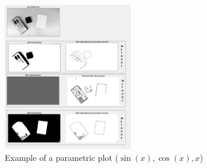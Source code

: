 \documentclass{article}
\begin{document}
\begin{figure}[h]
\caption{Example of a parametric plot ($\sin (x), \cos(x), x$)}
\centering
\includegraphics[width=0.5\textwidth]{comparison_methods}
\end{figure}
\end{document}
